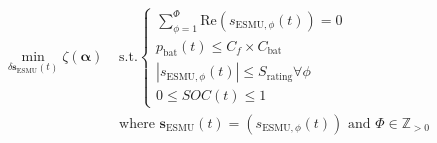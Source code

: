 \begin{equation}
\begin{split}
	\min_{\delta \textbf{s}_\text{ESMU}(t)} \zeta(\boldsymbol{\alpha})
	&\text{ s.t.}
	\begin{cases}
		\sum_{\phi=1}^{\Phi} \text{Re} \left(s_{\text{ESMU},\phi}(t)\right) = 0 \\
		p_\text{bat}(t) \leq C_f\times C_\text{bat} \\
		\left|s_{\text{ESMU},\phi}(t)\right| \leq S_\text{rating} \forall \phi \\
		0 \leq SOC(t) \leq 1 
	\end{cases}\\
	&\text{ where } \textbf{s}_\text{ESMU}(t) = (s_{\text{ESMU},\phi}(t)) \text{ and } \Phi \in \mathbb{Z}_{>0}
\end{split}
\label{ch1:equ:closed-loop-minimisation}
\end{equation}
